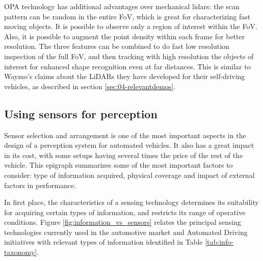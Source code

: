 OPA technology has additional advantages over mechanical lidars: the scan 
pattern can be random in the entire FoV, which is great for characterizing fast 
moving objects. It is possible to observe only a region of interest within the 
FoV. Also, it is possible to augment the point density within each frame for 
better resolution. The three features can be combined to do fast low resolution 
inspection of the full FoV, and then tracking with high resolution the objects
of interest for enhanced shape recognition even at far distances.
This is similar to Waymo's claims about the LiDARs they have developed for their
self-driving vehicles, as described in section \ref{sec:04-relevantdemos}.

\subsection{Using sensors for perception}

Sensor selection and arrangement is one of the most important aspects in the 
design of a perception system for automated vehicles. It also has a great impact
in its cost, with some setups having several times the price of the rest of 
the vehicle. 
This epigraph summarizes some of the most important factors to consider: type 
of information acquired, physical coverage and impact of external factors in 
performance.

In first place, the characteristics of a sensing technology determines its 
suitability for acquiring certain types of information, and restricts its range 
of operative conditions.
Figure \ref{fig:information_vs_sensors} relates the principal sensing 
technologies currently used in the automotive market and Automated Driving
initiatives with relevant types of information identified in Table 
\ref{tab:info-taxonomy}.

